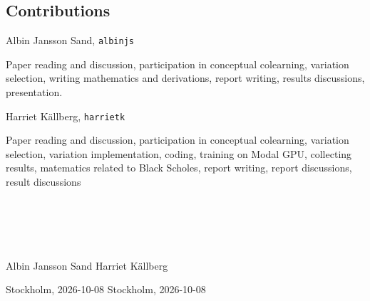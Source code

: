 \subsection*{Contributions}

Albin Jansson Sand, \texttt{albinjs}

Paper reading and discussion, participation in conceptual colearning, variation selection, writing mathematics and derivations, report writing, results discussions, presentation.

Harriet Källberg, \texttt{harrietk}

Paper reading and discussion, participation in conceptual colearning, variation selection, variation implementation, coding, training on Modal GPU, collecting results, matematics related to Black Scholes, report writing, report discussions, result discussions
\\
\\
\\
\\
\\
\\Albin Jansson Sand \hspace{10em} Harriet Källberg

Stockholm, 2026-10-08 \hspace{8em} Stockholm, 2026-10-08